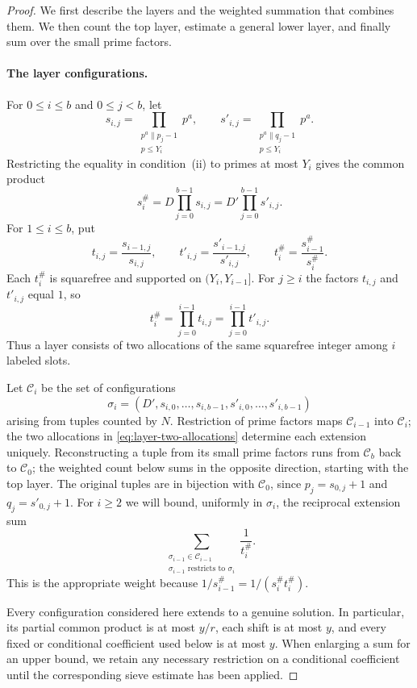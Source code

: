 \begin{proof}
We first describe the layers and the weighted summation that combines
them.  We then count the top layer, estimate a general lower layer,
and finally sum over the small prime factors.

\paragraph{The layer configurations.}
For $0\le i\le b$ and $0\le j<b$, let
\[
 s_{i,j}=\prod_{\substack{p^a\parallel p_j-1\\p\le Y_i}}p^a,
 \qquad
 s'_{i,j}=\prod_{\substack{p^a\parallel q_j-1\\p\le Y_i}}p^a.
\]
Restricting the equality in condition~\textup{(ii)} to primes at most
$Y_i$ gives the common product
\[
 s_i^\#=D\prod_{j=0}^{b-1}s_{i,j}
        =D'\prod_{j=0}^{b-1}s'_{i,j}.
\]
For $1\le i\le b$, put
\[
 t_{i,j}=\frac{s_{i-1,j}}{s_{i,j}},\qquad
 t'_{i,j}=\frac{s'_{i-1,j}}{s'_{i,j}},\qquad
 t_i^\#=\frac{s_{i-1}^\#}{s_i^\#}.
\]
Each $t_i^\#$ is squarefree and supported on $(Y_i,Y_{i-1}]$.
For $j\ge i$ the factors $t_{i,j}$ and $t'_{i,j}$ equal $1$, so
\begin{equation}\label{eq:layer-two-allocations}
 t_i^\#=\prod_{j=0}^{i-1}t_{i,j}
        =\prod_{j=0}^{i-1}t'_{i,j}.
\end{equation}
Thus a layer consists of two allocations of the same squarefree
integer among $i$ labeled slots.

Let $\mathcal C_i$ be the set of configurations
\[
 \sigma_i=(D',s_{i,0},\ldots,s_{i,b-1},
                   s'_{i,0},\ldots,s'_{i,b-1})
\]
arising from tuples counted by $N$.  Restriction of prime factors
maps $\mathcal C_{i-1}$ into $\mathcal C_i$; the two allocations in
\eqref{eq:layer-two-allocations} determine each extension uniquely.
Reconstructing a tuple from its small prime factors runs from
$\mathcal C_b$ back to $\mathcal C_0$; the weighted count below
sums in the opposite direction, starting with the top layer.
The original tuples are in bijection with $\mathcal C_0$, since
$p_j=s_{0,j}+1$ and $q_j=s'_{0,j}+1$.  For $i\ge2$ we will bound,
uniformly in $\sigma_i$, the reciprocal extension sum
\[
 \sum_{\substack{\sigma_{i-1}\in\mathcal C_{i-1}\\
                  \sigma_{i-1}\text{ restricts to }\sigma_i}}
       \frac1{t_i^\#}.
\]
This is the appropriate weight because
$1/s_{i-1}^\#=1/(s_i^\#t_i^\#)$.

Every configuration considered here extends to a genuine solution.
In particular, its partial common product is at most $y/r$, each
shift is at most $y$, and every fixed or conditional coefficient
used below is at most $y$.  When enlarging a sum for an upper bound,
we retain any necessary restriction on a conditional coefficient
until the corresponding sieve estimate has been applied.


\end{proof}
